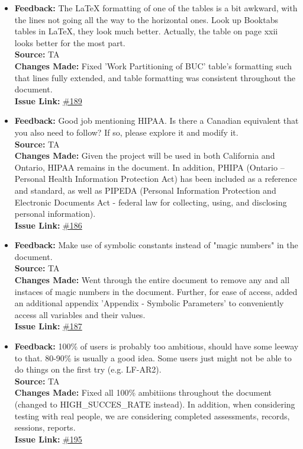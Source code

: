 \documentclass{article}
\begin{document}
\begin{itemize}
  \item 
    \textbf{Feedback:} The LaTeX formatting of one of the tables is a bit awkward, with the lines not going all the way to the horizontal ones. Look up Booktabs tables in LaTeX, they look much better. Actually, the table on page xxii looks better for the most part. \\
    \textbf{Source:} TA \\
    \textbf{Changes Made:} Fixed 'Work Partitioning of BUC' table's formatting such that lines fully extended, and table formatting was consistent throughout the document. \\
    \textbf{Issue Link:} \href{https://github.com/parishanizam/TeleHealth/issues/189}{\#189}

  \item 
    \textbf{Feedback:} Good job mentioning HIPAA. Is there a Canadian equivalent that you also need to follow? If so, please explore it and modify it. \\
    \textbf{Source:} TA \\
    \textbf{Changes Made:} Given the project will be used in both California and Ontario, HIPAA remains in the document. In addition, PHIPA (Ontario – Personal Health Information Protection Act) has been included as a reference and standard, as well as PIPEDA (Personal Information Protection and Electronic Documents Act - federal law for collecting, using, and disclosing personal information).\\
    \textbf{Issue Link:} \href{https://github.com/parishanizam/TeleHealth/issues/186}{\#186}

  \item 
    \textbf{Feedback:} Make use of symbolic constants instead of "magic numbers" in the document. \\
    \textbf{Source:} TA \\
    \textbf{Changes Made:} Went through the entire document to remove any and all instaces of magic numbers in the document. Further, for ease of access, added an additional appendix 'Appendix - Symbolic Parameters' to conveniently access all variables and their values.\\
    \textbf{Issue Link:} \href{https://github.com/parishanizam/TeleHealth/issues/187}{\#187}

  \item 
    \textbf{Feedback:} 100\% of users is probably too ambitious, should have some leeway to that. 80-90\% is usually a good idea. Some users just might not be able to do things on the first try (e.g. LF-AR2). \\
    \textbf{Source:} TA \\
    \textbf{Changes Made:} Fixed all 100\% ambitiions throughout the document (changed to HIGH\_SUCCES\_RATE instead). In addition, when considering testing with real people, we are considering completed assessments, records, sessions, reports.\\
    \textbf{Issue Link:} \href{https://github.com/parishanizam/TeleHealth/issues/195}{\#195}


\end{itemize}
\end{document}
